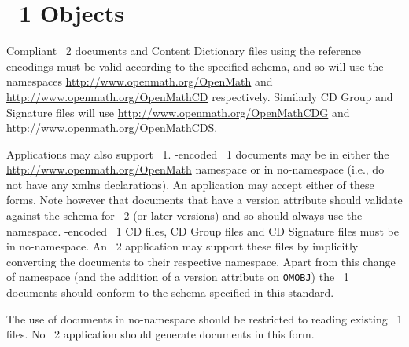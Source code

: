 \section{\OM~1 Objects}\label{sec_compl_om1}

Compliant \OM~2 documents and Content Dictionary files using the reference \XML encodings
must be valid according to the specified schema, and so will use the namespaces
\url{http://www.openmath.org/OpenMath} and \url{http://www.openmath.org/OpenMathCD}
respectively. Similarly CD Group and Signature files will use
\url{http://www.openmath.org/OpenMathCDG} and \url{http://www.openmath.org/OpenMathCDS}.

Applications may also support \OM~1.  \XML-encoded \OM~1 documents may be in either the
\url{http://www.openmath.org/OpenMath} namespace or in no-namespace (i.e., do not
have any xmlns declarations).  An application may accept either of these forms. Note
however that \OM documents that have a version attribute should validate against the
schema for \OM~2 (or later versions) and so should always use the \OM namespace.
\XML-encoded \OM~1 CD files, CD Group files and CD Signature files must be in
no-namespace. An \OM~2 application may support these files by implicitly converting the
documents to their respective namespace. Apart from this change of namespace (and the
addition of a version attribute on \lstinline|OMOBJ|) the \OM~1 documents should conform
to the schema specified in this standard.

The use of documents in no-namespace should be restricted to reading existing \OM~1 files.
No \OM~2 application should generate documents in this form.

